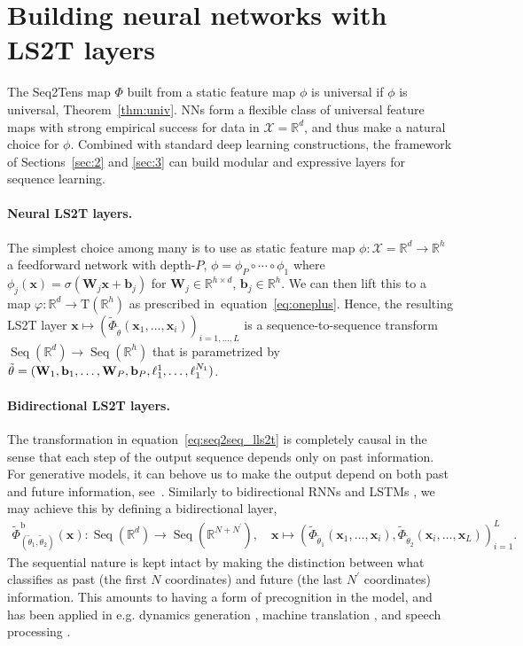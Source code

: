 \documentclass{article} \usepackage{iclr2021_conference,times}
\def\eqref#1{equation~\ref{#1}}
\newcommand{\R}{\mathbb{R}}
\newcommand{\bW}{\mathbf{W}}
\newcommand{\bx}{\mathbf{x}}
\newcommand{\cX}{\mathcal{X}}
\newcommand{\T}[1]{\mathrm{T}({#1})}
\newcommand{\Seq}[1]{\operatorname{Seq}(#1)}
\theoremstyle{plain}
\theoremstyle{definition}
\begin{document}
\section{Building neural networks with LS2T layers} \label{sec:4}
The Seq2Tens map $\Phi$ built from a static feature map $\phi$ is universal if $\phi$ is universal, Theorem~\ref{thm:univ}.
NNs form a flexible class of universal feature maps with strong empirical success for data in $\cX=\R^d$, and thus make a natural choice for $\phi$.
Combined with standard deep learning constructions, the framework of Sections~\ref{sec:2} and \ref{sec:3} can build modular and expressive layers for sequence learning.
\paragraph{Neural LS2T layers.}
The simplest choice among many is to use as static feature map $\phi:\cX=\R^d \to \R^h$ a feedforward network with depth-$P$, $\phi = \phi_{P} \circ \cdots \circ \phi_1$ where $\phi_{j}(\bx) = \sigma(\mathbf{W}_j \bx + \mathbf{b}_j)$ for $\mathbf{W}_j \in \R^{h \times d}$, $\mathbf{b}_j \in \R^{h}$.
We can then lift this to a map $\varphi: \R^d \to \T{\R^h}$ as prescribed in~\eqref{eq:oneplus}.
Hence, the resulting LS2T layer $\bx \mapsto (\tilde\Phi_{\tilde\theta} (\bx_1,\ldots,\bx_i))_{i=1,\ldots,L} $ is a sequence-to-sequence transform $\Seq{\R^d} \rightarrow \Seq{\R^h}$ that is parametrized by $\tilde \theta=(\bW_1, \bb_1, \dots, \bW_P, \bb_P, \ell_1^1, \dots, \ell^{N_1}_1)$.


\paragraph{Bidirectional LS2T layers.} The transformation in \eqref{eq:seq2seq_lls2t} is completely causal in the sense that each step of the output sequence depends only on past information.
For generative models, it can behove us to make the output depend on both past and future information, see~\citet{graves2013hybrid, baldi1999exploiting,li2018disentangled}.
Similarly to bidirectional RNNs and LSTMs \citep{schuster1997bidirectional, Graves2005BiLSTM}, we may achieve this by defining a bidirectional layer, 
\begin{align}
    \tilde\Phi^{\operatorname{b}}_{(\tilde\theta_1, \tilde\theta_2)}(\mathbf{x}): \Seq{\R^d} \rightarrow \Seq{\R^{N + N^{\prime}}}, \quad \mathbf{x} \mapsto (\tilde\Phi_{\tilde\theta_1}(\bx_1, \ldots, \bx_i), \tilde\Phi_{\tilde\theta_2}(\bx_i, \ldots, \bx_L))_{i=1}^L.
\end{align}
The sequential nature is kept intact by making the distinction between what classifies as past (the first $N$ coordinates) and future (the last $N^\prime$ coordinates) information. This amounts to having a form of precognition in the model, and has been applied in e.g. dynamics generation \citep{li2018disentangled}, machine translation \citep{sundermeyer2014translation}, and speech processing \citep{graves2013hybrid}.
\end{document}
